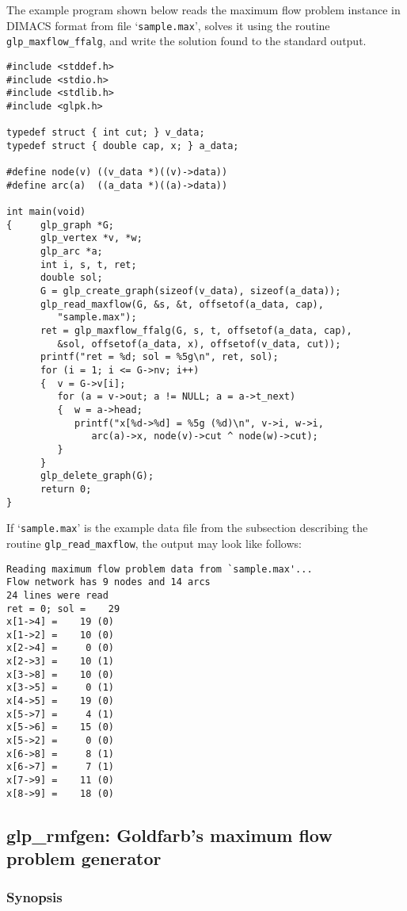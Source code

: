 The example program shown below reads the maximum flow problem instance
in DIMACS format from file `\verb|sample.max|', solves it using the
routine \verb|glp_maxflow_ffalg|, and write the solution found to the
standard output.

\begin{verbatim}
#include <stddef.h>
#include <stdio.h>
#include <stdlib.h>
#include <glpk.h>

typedef struct { int cut; } v_data;
typedef struct { double cap, x; } a_data;

#define node(v) ((v_data *)((v)->data))
#define arc(a)  ((a_data *)((a)->data))

int main(void)
{     glp_graph *G;
      glp_vertex *v, *w;
      glp_arc *a;
      int i, s, t, ret;
      double sol;
      G = glp_create_graph(sizeof(v_data), sizeof(a_data));
      glp_read_maxflow(G, &s, &t, offsetof(a_data, cap),
         "sample.max");
      ret = glp_maxflow_ffalg(G, s, t, offsetof(a_data, cap),
         &sol, offsetof(a_data, x), offsetof(v_data, cut));
      printf("ret = %d; sol = %5g\n", ret, sol);
      for (i = 1; i <= G->nv; i++)
      {  v = G->v[i];
         for (a = v->out; a != NULL; a = a->t_next)
         {  w = a->head;
            printf("x[%d->%d] = %5g (%d)\n", v->i, w->i,
               arc(a)->x, node(v)->cut ^ node(w)->cut);
         }
      }
      glp_delete_graph(G);
      return 0;
}
\end{verbatim}

If `\verb|sample.max|' is the example data file from the subsection
describing the routine \verb|glp_read_maxflow|, the output may look like
follows:

\begin{verbatim}
Reading maximum flow problem data from `sample.max'...
Flow network has 9 nodes and 14 arcs
24 lines were read
ret = 0; sol =    29
x[1->4] =    19 (0)
x[1->2] =    10 (0)
x[2->4] =     0 (0)
x[2->3] =    10 (1)
x[3->8] =    10 (0)
x[3->5] =     0 (1)
x[4->5] =    19 (0)
x[5->7] =     4 (1)
x[5->6] =    15 (0)
x[5->2] =     0 (0)
x[6->8] =     8 (1)
x[6->7] =     7 (1)
x[7->9] =    11 (0)
x[8->9] =    18 (0)
\end{verbatim}

\newpage

\subsection{glp\_rmfgen: Goldfarb's maximum flow problem generator}

\subsubsection*{Synopsis}

